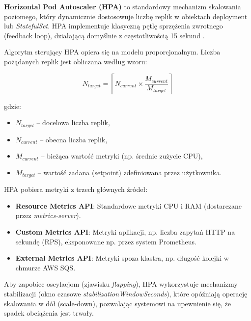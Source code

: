 \textbf{Horizontal Pod Autoscaler (HPA)} to standardowy mechanizm skalowania poziomego, który dynamicznie dostosowuje liczbę replik w obiektach \gls{deployment} lub \textit{StatefulSet}. HPA implementuje klasyczną pętlę sprzężenia zwrotnego (feedback loop), działającą domyślnie z częstotliwością 15 sekund \cite{kubernetes_hpa}.

Algorytm sterujący HPA opiera się na modelu proporcjonalnym. Liczba pożądanych replik jest obliczana według wzoru:

\begin{equation}
    N_{target} = \left\lceil N_{current} \times \frac{M_{current}}{M_{target}} \right\rceil
\end{equation}

gdzie:
\begin{itemize}
    \item $N_{target}$ – docelowa liczba replik,
    \item $N_{current}$ – obecna liczba replik,
    \item $M_{current}$ – bieżąca wartość metryki (np. średnie zużycie CPU),
    \item $M_{target}$ – wartość zadana (setpoint) zdefiniowana przez użytkownika.
\end{itemize}

HPA pobiera metryki z trzech głównych źródeł:
\begin{itemize}
    \item \textbf{Resource Metrics API}: Standardowe metryki CPU i RAM (dostarczane przez \textit{metrics-server}).
    \item \textbf{Custom Metrics API}: Metryki aplikacji, np. liczba zapytań HTTP na sekundę (RPS), eksponowane np. przez system Prometheus.
    \item \textbf{External Metrics API}: Metryki spoza klastra, np. długość kolejki w chmurze AWS SQS.
\end{itemize}

Aby zapobiec oscylacjom (zjawisku \textit{flapping}), HPA wykorzystuje mechanizmy stabilizacji (okno czasowe \textit{stabilizationWindowSeconds}), które opóźniają operację skalowania w dół (scale-down), pozwalając systemowi na upewnienie się, że spadek obciążenia jest trwały.

